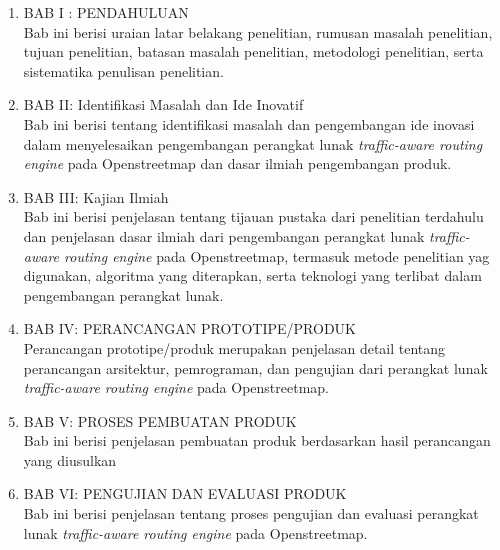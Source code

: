 \begin{enumerate}
    \item BAB I : PENDAHULUAN \\
    Bab ini berisi uraian latar belakang penelitian, rumusan masalah penelitian, tujuan penelitian, batasan masalah penelitian, metodologi penelitian, serta sistematika penulisan penelitian.
    \item BAB II: Identifikasi Masalah dan Ide Inovatif \\
    Bab ini berisi tentang identifikasi masalah dan pengembangan ide inovasi dalam menyelesaikan pengembangan perangkat lunak \textit{traffic-aware routing engine} pada Openstreetmap dan dasar ilmiah pengembangan produk.
    \item BAB III: Kajian Ilmiah \\ 
    Bab ini berisi penjelasan tentang tijauan pustaka dari penelitian terdahulu dan penjelasan dasar ilmiah dari pengembangan perangkat lunak \textit{traffic-aware routing engine} pada Openstreetmap, termasuk metode penelitian yag digunakan, algoritma yang diterapkan, serta teknologi yang terlibat dalam pengembangan perangkat lunak.
    \item BAB IV: PERANCANGAN PROTOTIPE/PRODUK \\
    Perancangan prototipe/produk merupakan penjelasan detail tentang perancangan arsitektur, pemrograman, dan pengujian dari perangkat lunak \textit{traffic-aware routing engine} pada Openstreetmap.
    \item BAB V: PROSES PEMBUATAN PRODUK \\ 
    Bab ini berisi penjelasan pembuatan produk berdasarkan hasil perancangan yang diusulkan
    \item BAB VI: PENGUJIAN DAN EVALUASI PRODUK \\ 
    Bab ini berisi penjelasan tentang proses pengujian dan evaluasi perangkat lunak \textit{traffic-aware routing engine} pada Openstreetmap. 
    
\end{enumerate}